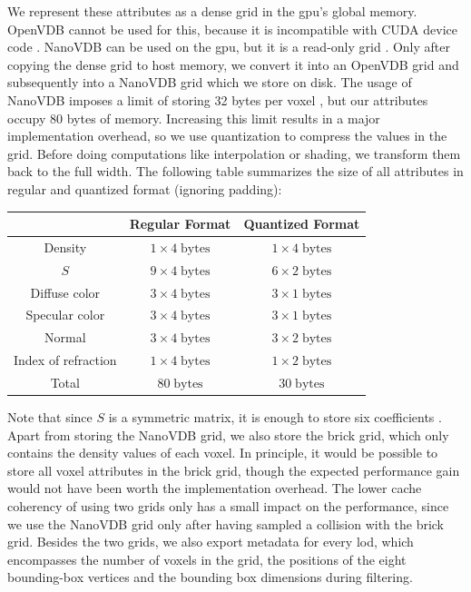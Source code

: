We represent these attributes as a dense grid in the \acs{gpu}'s global memory.
OpenVDB cannot be used for this, because it is incompatible with CUDA device code \cite{museth_nanovdb}.
NanoVDB can be used on the \ac{gpu}, but it is a read-only grid \cite{nanovdb}.
Only after copying the dense grid to host memory, we convert it into an OpenVDB grid and subsequently into a NanoVDB grid which we store on disk.
The usage of NanoVDB imposes a limit of storing 32 bytes per voxel \cite{open_to_nanovdb}, but our attributes occupy 80 bytes of memory.
Increasing this limit results in a major implementation overhead, so we use quantization to compress the values in the grid.
Before doing computations like interpolation or shading, we transform them back to the full width.
The following table summarizes the size of all attributes in regular and quantized format (ignoring padding):
\begin{center}
    \begin{tabular}{| c | c | c | }
        \hline
         & Regular Format & Quantized Format \\
         \hline
         Density & $1\times 4\;\text{bytes}$ & $1\times 4\;\text{bytes}$ \\
         \hline
         $S$ & $9\times 4\;\text{bytes}$ & $6\times 2\;\text{bytes}$ \\
         \hline
         Diffuse color & $3\times 4\;\text{bytes}$ & $3\times 1\;\text{bytes}$ \\
         \hline
         Specular color & $3\times 4\;\text{bytes}$ & $3\times 1\;\text{bytes}$ \\
         \hline
         Normal & $3\times 4\;\text{bytes}$ & $3\times 2\;\text{bytes}$ \\
         \hline
         Index of refraction & $1\times 4\;\text{bytes}$ & $1\times 2\;\text{bytes}$ \\
         \thickhline
         Total & $80\;\text{bytes}$ & $30\;\text{bytes}$ \\
         \hline
    \end{tabular}
\end{center}
Note that since $S$ is a symmetric matrix, it is enough to store six coefficients \cite{sggx}.
Apart from storing the NanoVDB grid, we also store the brick grid, which only contains the density values of each voxel.
In principle, it would be possible to store all voxel attributes in the brick grid, though the expected performance gain would not have been worth the implementation overhead.
The lower cache coherency of using two grids only has a small impact on the performance, since we use the NanoVDB grid only after having sampled a collision with the brick grid.
Besides the two grids, we also export metadata for every \ac{lod}, which encompasses the number of voxels in the grid, the positions of the eight bounding-box vertices and the bounding box dimensions during filtering.

